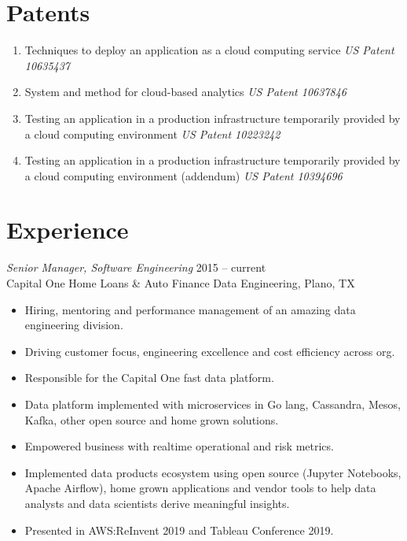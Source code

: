 \documentclass[margin]{res}
\begin{document}
\begin{resume}
    \section{Patents}
    \begin{enumerate}[leftmargin=0.5cm] \itemsep -2pt %
        \item Techniques to deploy an application as a cloud computing service {\sl US Patent 10635437}
        \item System and method for cloud-based analytics {\sl US Patent 10637846}
        \item Testing an application in a production infrastructure temporarily provided by a cloud computing environment {\sl US Patent 10223242}
        \item Testing an application in a production infrastructure temporarily provided by a cloud computing environment (addendum) {\sl US Patent 10394696}
    \end{enumerate}


    \section{Experience} {\sl Senior Manager, Software Engineering } \hfill 2015 -- current \\
    Capital One Home Loans \& Auto Finance Data Engineering, Plano, TX
    \begin{itemize} \itemsep -2pt %
        \item Hiring, mentoring and performance management of an amazing data engineering division.
        \item Driving customer focus, engineering excellence and cost efficiency across org.
        \item Responsible for the Capital One fast data platform.
        \item Data platform implemented with microservices in Go lang, Cassandra, Mesos, Kafka, other open source and home grown solutions.
        \item Empowered business with realtime operational and risk metrics.
        \item Implemented data products ecosystem using open source (Jupyter Notebooks, Apache Airflow), home grown applications and vendor tools to help data analysts and data scientists derive meaningful insights.
        \item Presented in AWS:ReInvent 2019 and Tableau Conference 2019.
    \end{itemize}


\end{resume}
\end{document}
